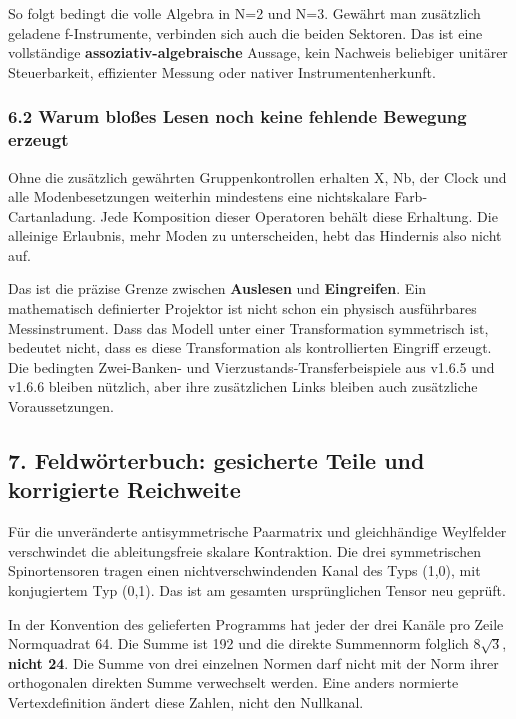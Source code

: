 So folgt bedingt die volle Algebra in N=2 und N=3. Gewährt man
zusätzlich geladene f-Instrumente, verbinden sich auch die beiden
Sektoren. Das ist eine vollständige \textbf{assoziativ-algebraische}
Aussage, kein Nachweis beliebiger unitärer Steuerbarkeit, effizienter
Messung oder nativer Instrumentenherkunft.

\subsubsection{6.2 Warum bloßes Lesen noch keine fehlende Bewegung
erzeugt}\label{warum-blouxdfes-lesen-noch-keine-fehlende-bewegung-erzeugt}

Ohne die zusätzlich gewährten Gruppenkontrollen erhalten X, Nb, der
Clock und alle Modenbesetzungen weiterhin mindestens eine nichtskalare
Farb-Cartanladung. Jede Komposition dieser Operatoren behält diese
Erhaltung. Die alleinige Erlaubnis, mehr Moden zu unterscheiden, hebt
das Hindernis also nicht auf.

Das ist die präzise Grenze zwischen \textbf{Auslesen} und
\textbf{Eingreifen}. Ein mathematisch definierter Projektor ist nicht
schon ein physisch ausführbares Messinstrument. Dass das Modell unter
einer Transformation symmetrisch ist, bedeutet nicht, dass es diese
Transformation als kontrollierten Eingriff erzeugt. Die bedingten
Zwei-Banken- und Vierzustands-Transferbeispiele aus v1.6.5 und v1.6.6
bleiben nützlich, aber ihre zusätzlichen Links bleiben auch zusätzliche
Voraussetzungen.

\subsection{7. Feldwörterbuch: gesicherte Teile und korrigierte
Reichweite}\label{feldwuxf6rterbuch-gesicherte-teile-und-korrigierte-reichweite}

Für die unveränderte antisymmetrische Paarmatrix und gleichhändige
Weylfelder verschwindet die ableitungsfreie skalare Kontraktion. Die
drei symmetrischen Spinortensoren tragen einen nichtverschwindenden
Kanal des Typs (1,0), mit konjugiertem Typ (0,1). Das ist am gesamten
ursprünglichen Tensor neu geprüft.

In der Konvention des gelieferten Programms hat jeder der drei Kanäle
pro Zeile Normquadrat 64. Die Summe ist 192 und die direkte Summennorm
folglich \(8\sqrt3\), \textbf{nicht 24}. Die Summe von drei einzelnen
Normen darf nicht mit der Norm ihrer orthogonalen direkten Summe
verwechselt werden. Eine anders normierte Vertexdefinition ändert diese
Zahlen, nicht den Nullkanal.

